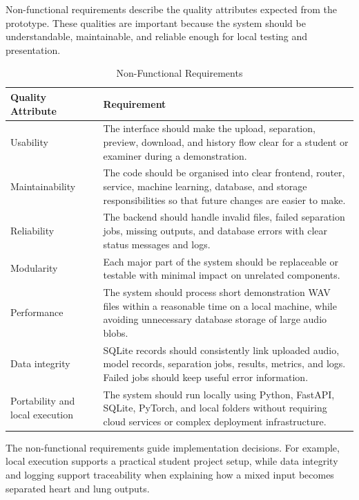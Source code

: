 Non-functional requirements describe the quality attributes expected from the prototype. These qualities are important because the system should be understandable, maintainable, and reliable enough for local testing and presentation.

\begin{table}[H]
  \centering
  \small
  \caption{Non-Functional Requirements}
  \label{tab:non-functional-requirements}
  \begin{tabularx}{\textwidth}{p{} Y}
    \toprule
    \textbf{Quality Attribute} & \textbf{Requirement} \\
    \midrule
    Usability & The interface should make the upload, separation, preview, download, and history flow clear for a student or examiner during a demonstration. \\
    Maintainability & The code should be organised into clear frontend, router, service, machine learning, database, and storage responsibilities so that future changes are easier to make. \\
    Reliability & The backend should handle invalid files, failed separation jobs, missing outputs, and database errors with clear status messages and logs. \\
    Modularity & Each major part of the system should be replaceable or testable with minimal impact on unrelated components. \\
    Performance & The system should process short demonstration WAV files within a reasonable time on a local machine, while avoiding unnecessary database storage of large audio blobs. \\
    Data integrity & SQLite records should consistently link uploaded audio, model records, separation jobs, results, metrics, and logs. Failed jobs should keep useful error information. \\
    Portability and local execution & The system should run locally using Python, FastAPI, SQLite, PyTorch, and local folders without requiring cloud services or complex deployment infrastructure. \\
    \bottomrule
  \end{tabularx}
\end{table}

The non-functional requirements guide implementation decisions. For example, local execution supports a practical student project setup, while data integrity and logging support traceability when explaining how a mixed input becomes separated heart and lung outputs.

